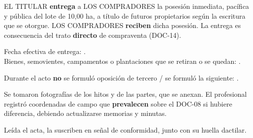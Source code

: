 \documentclass[12pt,a4paper]{article}
\begin{document}
EL TITULAR \textbf{entrega} a LOS COMPRADORES la posesión inmediata, pacífica y pública del lote de 10,00 ha, a título de futuros propietarios según la escritura que se otorgue. LOS COMPRADORES \textbf{reciben} dicha posesión. La entrega es consecuencia del trato \textbf{directo} de compraventa (DOC-14).

\vspace{0.25em}
\noindent Fecha efectiva de entrega: \linea[4.2cm].\\
Bienes, semovientes, campamentos o plantaciones que se retiran o se quedan: .

Durante el acto \textbf{no} se formuló oposición de tercero / se formuló la siguiente: .

Se tomaron fotografías de los hitos y de las partes, que se anexan. El profesional registró coordenadas de campo que \textbf{prevalecen} sobre el DOC-08 si hubiere diferencia, debiendo actualizarse memorias y minutas.

Leída el acta, la suscriben en señal de conformidad, junto con su huella dactilar.

\LugarFecha
{}

\vspace{0.55em}
\noindent
{}
\hfill
{}

\vspace{0.45em}
\noindent
{}

\vspace{0.7em}
\\
\noindent{}
\end{document}
